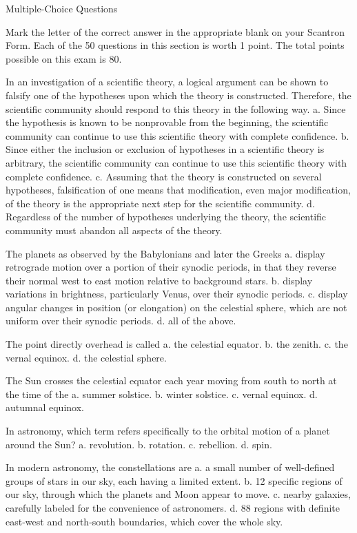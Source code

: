 Multiple-Choice Questions

    Mark the letter of the correct answer in the appropriate blank on your Scantron Form. Each of the 50 questions in this section is worth 1 point. The total points possible on this exam is 80.

    In an investigation of a scientific theory, a logical argument can be shown to falsify one of the hypotheses upon which the theory is constructed. Therefore, the scientific community should respond to this theory in the following way.
    a. Since the hypothesis is known to be nonprovable from the beginning, the scientific community can continue to use this scientific theory with complete confidence.
    b. Since either the inclusion or exclusion of hypotheses in a scientific theory is arbitrary, the scientific community can continue to use this scientific theory with complete confidence.
    c. Assuming that the theory is constructed on several hypotheses, falsification of one means that modification, even major modification, of the theory is the appropriate next step for the scientific community.
    d. Regardless of the number of hypotheses underlying the theory, the scientific community must abandon all aspects of the theory.

    The planets as observed by the Babylonians and later the Greeks
    a. display retrograde motion over a portion of their synodic periods, in that they reverse their normal west to east motion relative to background stars.
    b. display variations in brightness, particularly Venus, over their synodic periods.
    c. display angular changes in position (or elongation) on the celestial sphere, which are not uniform over their synodic periods.
    d. all of the above.

    The point directly overhead is called
    a. the celestial equator.
    b. the zenith.
    c. the vernal equinox.
    d. the celestial sphere.

    The Sun crosses the celestial equator each year moving from south to north at the time of the
    a. summer solstice.
    b. winter solstice.
    c. vernal equinox.
    d. autumnal equinox.

    In astronomy, which term refers specifically to the orbital motion of a planet around the Sun?
    a. revolution.
    b. rotation.
    c. rebellion.
    d. spin.

    In modern astronomy, the constellations are
    a. a small number of well-defined groups of stars in our sky, each having a limited extent.
    b. 12 specific regions of our sky, through which the planets and Moon appear to move.
    c. nearby galaxies, carefully labeled for the convenience of astronomers.
    d. 88 regions with definite east-west and north-south boundaries, which cover the whole sky.

